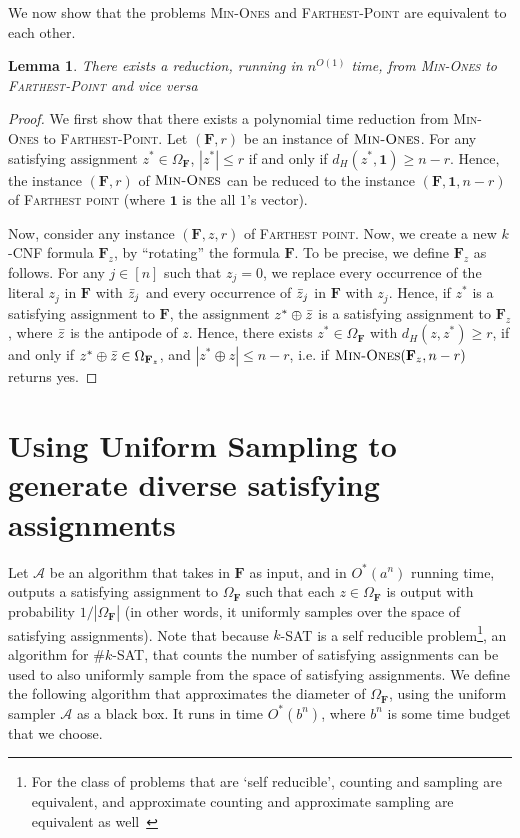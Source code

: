 \documentclass[11pt, letterpaper]{article}
\newtheorem{lemma}[theorem]{Lemma}
\theoremstyle{definition}
\newcommand{\alg}{\mathcal{A}}
\newcommand{\f}{\mathbf{F}}
\newcommand{\Om}{\Omega_{\f}}
\begin{document}
 We now show that the problems \textsc{Min-Ones} and \textsc{Farthest-Point} are equivalent to each other. 
 \begin{lemma}
     There exists a reduction, running in $n^{O(1)}$ time, from \textsc{Min-Ones} to \textsc{Farthest-Point} and vice versa
 \end{lemma}
 \begin{proof}
     We first show that there exists a polynomial time reduction from \textsc{Min-Ones} to \textsc{Farthest-Point}. Let $(\f, r)$ be an instance of $\textsc{Min-Ones}$. For any satisfying assignment $z^* \in \Om$, $|z^*| \leq r$ if and only if $d_H(z^*, \mathbf{1}) \geq n-r$. Hence, the instance $(\f, r)$ of $\textsc{Min-Ones}$ can be reduced to the instance $(\f,\mathbf{1}, n-r)$ of \textsc{Farthest point} (where $\mathbf{1}$ is the all $1$'s vector).

     Now, consider any instance $(\f, z, r)$ of \textsc{Farthest point}. Now, we create a new $k$-CNF formula $\f_{z}$, by ``rotating'' the formula $\f$. To be precise, we define $\f_{z}$ as follows. For any $j \in [n]$ such that $z_j=0$, we replace every occurrence of the literal $z_j$ in $\f$ with $\Bar{z}_j$ and every occurrence of $\Bar{z}_j$ in $\f$ with $z_j$. Hence, if $z^*$ is a satisfying assignment to $\f$, the assignment $z^* \oplus \Bar{z}$ is a satisfying assignment to $\f_{z}$, where $\Bar{z}$ is the antipode of $z$. Hence, there exists $z^* \in \Om$ with $d_H(z,z^*) \geq r$, if and only if $z^* \oplus \Bar{z} \in \Omega_{\f_z}$, and $|z^* \oplus z|\leq n-r$, i.e. if $\textsc{Min-Ones}(\f_z, n-r)$ returns yes. 
 \end{proof} \section{Using Uniform Sampling to generate diverse satisfying assignments}\label{app:uniformv2}


Let $\alg$ be an algorithm that takes in $\f$ as input, and in $O^*(a^n)$ running time, outputs a satisfying assignment to $\Om$ such that each $z \in \Om$ is output with probability $1/|\Om|$ (in other words, it uniformly samples over the space of satisfying assignments). Note that because $k$-SAT is a self reducible problem\footnote{For the class of problems that are `self reducible', counting and sampling are equivalent, and approximate counting and approximate sampling are equivalent as well~\cite{sinclair1989approximate}}, an algorithm for $\# k$-SAT, that counts the number of satisfying assignments can be used to also uniformly sample from the space of satisfying assignments. We define the following algorithm that approximates the diameter of $\Om$, using the uniform sampler $\alg$ as a black box. It runs in time $O^*(b^n)$, where $b^n $ is some time budget that we choose.
\end{document}
